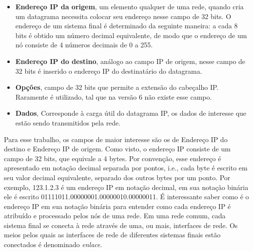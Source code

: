 \documentclass[	12pt, Times, openright, twoside, a4paper, english, brazil]{abntex2}
\begin{document}
\begin{itemize}
    \item{\textbf{Endereço IP da origem}}, um elemento qualquer de uma rede, quando cria um datagrama necessita colocar seu endereço nesse campo de 32 bits. O endereço de um sistema final é determinado da seguinte maneira: a cada 8 bits é obtido um número decimal equivalente, de modo que o endereço de um nó consiste de 4 números decimais de 0 a 255. 
    \item{\textbf{Endereço IP do destino}}, análogo ao campo IP de origem, nesse campo de 32 bits é inserido o endereço IP do destinatário do datagrama.
    \item{\textbf{Opções}}, campo de 32 bits que permite a extensão do cabeçalho IP. Raramente é utilizado, tal que na versão 6 não existe esse campo.
    \item{\textbf{Dados}}, Corresponde à carga útil do datagrama IP, os dados de interesse que estão sendo transmitidos pela rede.
\end{itemize}



Para esse trabalho, os campos de maior interesse são os de Endereço IP do destino e Endereço IP de origem. Como visto, o endereço IP consiste de um campo de 32 bits, que equivale a 4 bytes. Por convenção, esse endereço é apresentado em notação decimal separada por pontos, i.e., cada byte é escrito em seu valor decimal equivalente, separado dos outros bytes por um ponto. Por exemplo, 123.1.2.3 é um endereço IP em notação decimal, em sua notação binária ele é escrito 01111011.00000001.00000010.00000011. É interessante saber como é o endereço IP em sua notação binária para entender como cada endereço IP é atribuído e processado pelos nós de uma rede. Em uma rede comum, cada sistema final se conecta à rede através de uma, ou mais, interfaces de rede. Os meios pelos quais as interfaces de rede de diferentes sistemas finais estão conectados é denominado \textit{enlace}.
\end{document}
